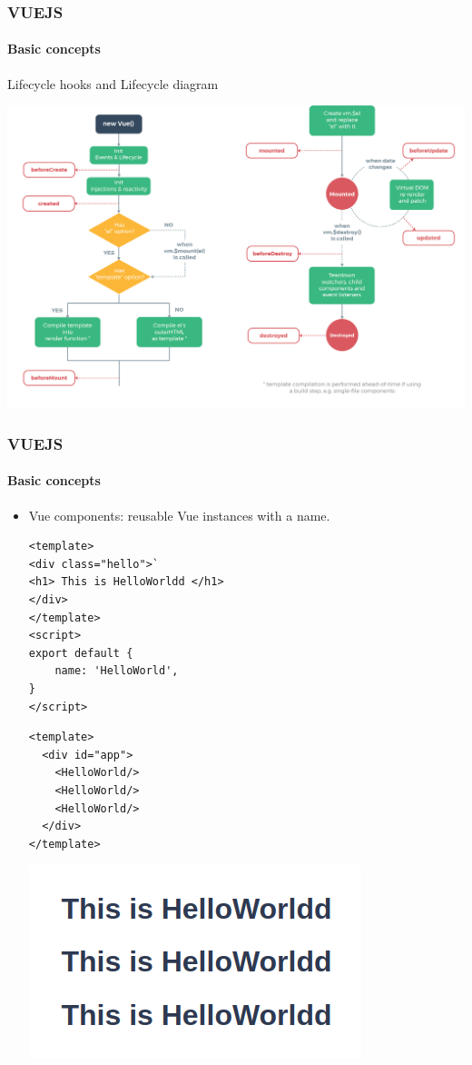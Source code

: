 \documentclass[10pt]{beamer}
\begin{document}
\begin{frame}
    \frametitle{\textbf{VUEJS}}
    \framesubtitle{\textbf{Basic concepts}}
    Lifecycle hooks and Lifecycle diagram 
    {\centering\includegraphics[scale=0.14]{vue_lifecycle.png}\par}
\end{frame}
\begin{frame}[fragile]
    \frametitle{\textbf{VUEJS}}
    \framesubtitle{\textbf{Basic concepts}}
    \begin{itemize}
        \item Vue components: reusable Vue instances with a name.
        \begin{minipage}{0.5\textwidth}
            \begin{lstlisting}[language=VueJS, caption=HelloWorld.vue]
<template>
<div class="hello">`
<h1> This is HelloWorldd </h1>
</div>
</template>
<script>
export default {
    name: 'HelloWorld',
}
</script>
            \end{lstlisting}
        \end{minipage}
        \hspace{0.1\textwidth}
        \begin{minipage}{0.3\textwidth}
            \begin{lstlisting}[language=VueJS, caption=App.vue]
<template>
  <div id="app">
    <HelloWorld/>
    <HelloWorld/>
    <HelloWorld/>
  </div>
</template>
            \end{lstlisting}
        \vspace{1cm}
        \includegraphics[scale=0.3]{helloworld.png}
        \end{minipage}
    \end{itemize}
\end{frame}
\end{document}
